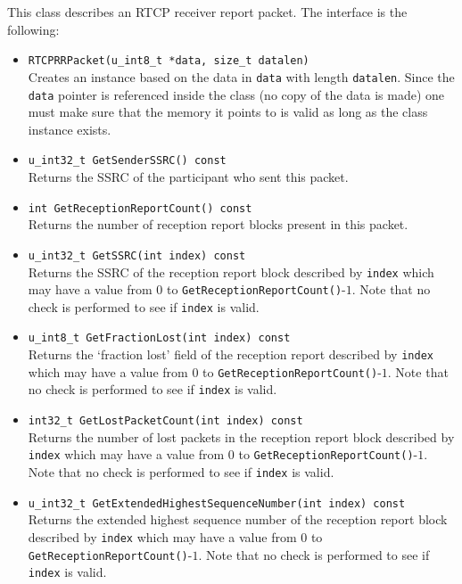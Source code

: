 \documentclass[12pt,a4paper]{article}
\begin{document}
					This class describes an RTCP receiver report packet. The interface
					is the following:
					\begin{itemize}
						\item {\tt RTCPRRPacket(u\_int8\_t *data, size\_t datalen)}\\
							Creates an instance based on the data in {\tt data} with
							length {\tt datalen}. Since the {\tt data} pointer
							is referenced inside the class (no copy of the data is
							made) one must make sure that the memory it points to is
							valid as long as the class instance exists.
						\item {\tt u\_int32\_t GetSenderSSRC() const}\\
							Returns the SSRC of the participant who sent this packet.
						\item {\tt int GetReceptionReportCount() const}\\
							Returns the number of reception report blocks present
							in this packet.
						\item {\tt u\_int32\_t GetSSRC(int index) const}\\
							Returns the SSRC of the reception report block described
							by {\tt index} which may have a value from $0$ to
							{\tt GetReceptionReportCount()}-$1$. Note that no
							check is performed to see if {\tt index} is valid.
						\item {\tt u\_int8\_t GetFractionLost(int index) const}\\
							Returns the `fraction lost' field of the reception 
							report described by {\tt index} which may have a value 
							from $0$ to {\tt GetReceptionReportCount()}-$1$. Note that 
							no check is performed to see if {\tt index} is valid.
						\item {\tt int32\_t GetLostPacketCount(int index) const}\\
							Returns the number of lost packets in the reception 
							report block described by {\tt index} which may have a value 
							from $0$ to {\tt GetReceptionReportCount()}-$1$. Note that 
							no check is performed to see if {\tt index} is valid.
						\item {\tt u\_int32\_t GetExtendedHighestSequenceNumber(int index) const}\\
							Returns the extended highest sequence number of the reception 
							report block described by {\tt index} which may have a value 
							from $0$ to {\tt GetReception\-Report\-Count()}-$1$. Note that 
							no check is performed to see if {\tt index} is valid.

\end{itemize}
\end{document}
